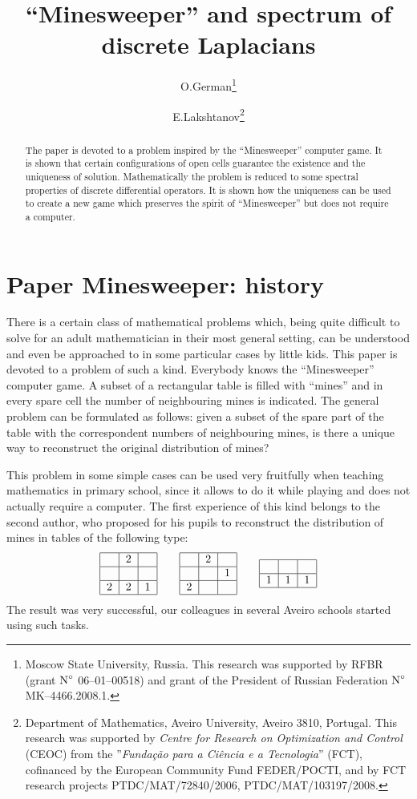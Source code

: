 \documentclass[english,12pt]{article}
\author{O.German\thanks{Moscow State University, Russia. This research was  supported by
                        RFBR (grant $\textup N^\circ$ 06--01--00518) and
                        grant of the President of Russian Federation
                        $\textup N^\circ$ MK--4466.2008.1. }
\and E.Lakshtanov\thanks{Department of Mathematics, Aveiro
University, Aveiro 3810, Portugal. This research was supported by
{\it Centre for Research on Optimization and Control} (CEOC) from
the ''{\it Funda\c{c}\~{a}o para a Ci\^{e}ncia e a Tecnologia}''
(FCT), cofinanced by the European Community Fund FEDER/POCTI, and
by FCT research projects PTDC/MAT/72840/2006,
PTDC/MAT/103197/2008.}}
\title{``Minesweeper'' and spectrum of discrete Laplacians}
\date{}
\theoremstyle{remark}
\theoremstyle{definition}
\theoremstyle{definition}
\begin{document}
\maketitle

\begin{abstract}
The paper is devoted to a problem inspired by the ``Minesweeper''
computer game. It is shown that certain configurations of open
cells guarantee the existence and the uniqueness of solution.
Mathematically the problem is reduced to some spectral properties
of discrete differential operators. It is shown how the uniqueness
can be used to create a new game which preserves the spirit of
``Minesweeper'' but does not require a computer.
\end{abstract}



\section{Paper Minesweeper: history}


There is a certain class of mathematical problems which, being quite difficult to solve for an
adult mathematician in their most general setting, can be understood and even be approached to in
some particular cases by little kids. This paper is devoted to a problem of such a kind. Everybody
knows the ``Minesweeper'' computer game. A subset of a rectangular table is filled with ``mines''
and in every spare cell the number of neighbouring mines is indicated. The general problem can be
formulated as follows: given a subset of the spare part of the table with the correspondent numbers
of neighbouring mines, is there a unique way to reconstruct the original distribution of mines?

This problem in some simple cases can be used very fruitfully when teaching mathematics in primary
school, since it allows to do it while playing and does not actually require a computer. The first
experience of this kind belongs to the second author, who proposed for his pupils to reconstruct
the distribution of mines in tables of the following type:
\[ \begin{tabular}{|c|c|c|}
     \hline &2&\\ \hline &&\\ \hline 2&2&1\\ \hline
   \end{tabular} \quad \quad
   \begin{tabular}{|c|c|c|}
     \hline &2&\\ \hline &&1\\ \hline 2 & &\\ \hline
   \end{tabular} \quad \quad
   \begin{tabular}{|c|c|c|}
     \hline &&\\ \hline 1&1&1\\ \hline
   \end{tabular} \]
The result was very successful, our colleagues in several Aveiro
schools started using such tasks.
\end{document}
